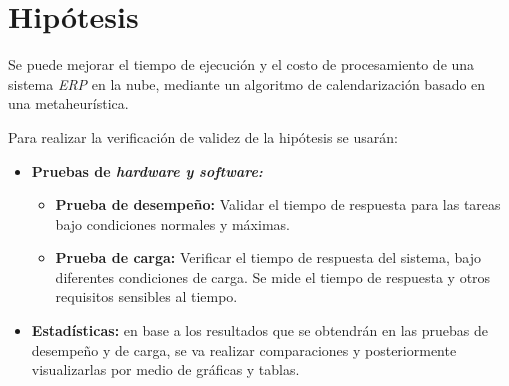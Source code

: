 \newpage

\section*{Hip\'otesis}


Se puede mejorar el tiempo de ejecución y el costo de procesamiento de una sistema \textit{ERP}  en la nube, mediante un algoritmo de calendarización basado en una metaheurística. 

Para realizar la verificaci\'on de validez de la hip\'otesis se usar\'an:


\begin{itemize}
	\item \textbf{Pruebas de \textit{hardware y software:}}
	\begin{itemize}
	\item \textbf{Prueba de desempeño:} Validar el tiempo de respuesta para las tareas bajo condiciones normales y m\'aximas.
	\item \textbf{Prueba de carga:} Verificar el tiempo de respuesta del sistema, bajo diferentes condiciones de carga. Se mide el tiempo de respuesta y otros requisitos sensibles al tiempo.
	\end{itemize}
	\item \textbf{Estad\'isticas:} en base a los resultados que se obtendr\'an en las pruebas de desempeño y de carga, se va realizar comparaciones y posteriormente visualizarlas por medio de gr\'aficas y tablas.
\end{itemize}
